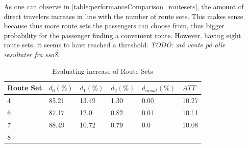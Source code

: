 As one can observe in \vref{table:performanceComparison_routesets}, the amount of direct travelers increase in line with the number of route sets. This makes sense because thus more route sets the passengers can choose from, thus bigger probability for the passenger finding a convenient route. However, having eight route sets, it seems to have reached a threshold. \emph{\color{blue} TODO: må vente på alle resultater fra sso8}.

 \begin{table}[H]
    \centering
    \begin{tabular}{|l||l|l|l|l|l|}
    \hline
    Route Set & $d_0(\%)$ & $d_1(\%)$ & $d_2(\%)$ & $d_{unsat}(\%)$ & $ATT$ \\
    \hline
    4 & 85.21 & 13.49 & 1.30 & 0.00 & 10.27\\
    6 & 87.17 & 12.0 & 0.82 & 0.01 & 10.11\\
    7 & 88.49 & 10.72 & 0.79 & 0.0 & 10.08\\
    8\\
    \hline
    \end{tabular}
    \caption {Evaluating increase of Route Sets}
    \label{table:performanceComparison_routesets}
\end{table}

